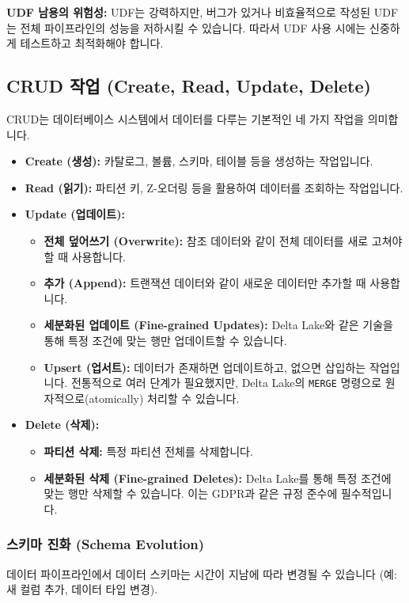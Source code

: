 \documentclass[11pt,a4paper]{article}
\theoremstyle{definition}
\begin{document}
\begin{warningbox}
\textbf{UDF 남용의 위험성:}
UDF는 강력하지만, 버그가 있거나 비효율적으로 작성된 UDF는 전체 파이프라인의 성능을 저하시킬 수 있습니다. 따라서 UDF 사용 시에는 신중하게 테스트하고 최적화해야 합니다.
\end{warningbox}

\subsection{CRUD 작업 (Create, Read, Update, Delete)}
CRUD는 데이터베이스 시스템에서 데이터를 다루는 기본적인 네 가지 작업을 의미합니다.

\begin{itemize}
    \item \textbf{Create (생성):} 카탈로그, 볼륨, 스키마, 테이블 등을 생성하는 작업입니다.
    \item \textbf{Read (읽기):} 파티션 키, Z-오더링 등을 활용하여 데이터를 조회하는 작업입니다.
    \item \textbf{Update (업데이트):}
    \begin{itemize}
        \item \textbf{전체 덮어쓰기 (Overwrite):} 참조 데이터와 같이 전체 데이터를 새로 고쳐야 할 때 사용합니다.
        \item \textbf{추가 (Append):} 트랜잭션 데이터와 같이 새로운 데이터만 추가할 때 사용합니다.
        \item \textbf{세분화된 업데이트 (Fine-grained Updates):} Delta Lake와 같은 기술을 통해 특정 조건에 맞는 행만 업데이트할 수 있습니다.
        \item \textbf{Upsert (업서트):} 데이터가 존재하면 업데이트하고, 없으면 삽입하는 작업입니다. 전통적으로 여러 단계가 필요했지만, Delta Lake의 \texttt{MERGE} 명령으로 원자적으로(atomically) 처리할 수 있습니다.
    \end{itemize}
    \item \textbf{Delete (삭제):}
    \begin{itemize}
        \item \textbf{파티션 삭제:} 특정 파티션 전체를 삭제합니다.
        \item \textbf{세분화된 삭제 (Fine-grained Deletes):} Delta Lake를 통해 특정 조건에 맞는 행만 삭제할 수 있습니다. 이는 GDPR과 같은 규정 준수에 필수적입니다.
    \end{itemize}
\end{itemize}

\subsubsection{스키마 진화 (Schema Evolution)}
데이터 파이프라인에서 데이터 스키마는 시간이 지남에 따라 변경될 수 있습니다 (예: 새 컬럼 추가, 데이터 타입 변경).
\end{document}
